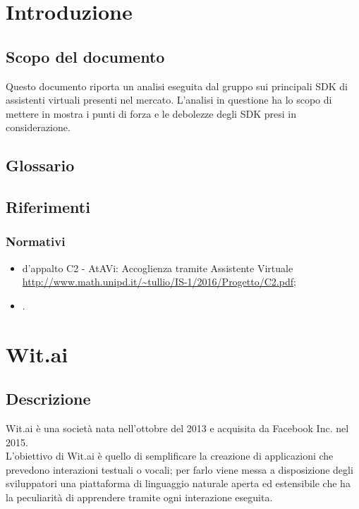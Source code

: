 \documentclass[a4paper,titlepage]{article}
\begin{document}
\maketitle

\newpage
\tableofcontents
\newpage
\listoffigures
\newpage\texttt{}
\listoftables
\newpage
\listoftables

\section{Introduzione}
	\subsection{Scopo del documento}
Questo documento riporta un analisi eseguita dal gruppo \GRUPPO{} sui principali SDK di assistenti virtuali presenti nel mercato. L'analisi in questione ha lo scopo di mettere in mostra i punti di forza e le debolezze degli SDK presi in considerazione.
	\subsection{Glossario}
	\GLOSSARIO
	\subsection{Riferimenti}
		\subsubsection{Normativi}
\begin{itemize}
\item {} d'appalto C2 - AtAVi: Accoglienza tramite Assistente Virtuale \\	\url{http://www.math.unipd.it/~tullio/IS-1/2016/Progetto/C2.pdf};
\item \NPdoc.
\end{itemize}
\section{Wit.ai}
	\subsection{Descrizione}
Wit.ai è una società nata nell'ottobre del 2013 e acquisita da Facebook Inc. nel 2015. \\
L'obiettivo di Wit.ai è quello di semplificare la creazione di applicazioni che prevedono interazioni testuali o vocali; per farlo viene messa a disposizione degli sviluppatori una piattaforma di linguaggio naturale aperta ed estensibile che ha la peculiarità di apprendere tramite ogni interazione eseguita.
\end{document}

